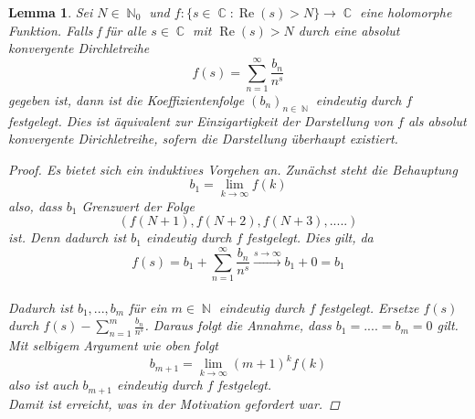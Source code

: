 \documentclass[10pt,a4paper]{article}
\theoremstyle{plain}
\newtheorem{lem}[thm]{Lemma}
\theoremstyle{definition}
\theoremstyle{remark}
\DeclareMathOperator{\C}{\mathbb{C}}
\DeclareMathOperator{\N}{\mathbb{N}}
\DeclareMathOperator{\re}{Re}
\begin{document}
 \begin{lem}
 
Sei $N \in \N_0$ und $f \colon \{s \in \C \colon \re(s)>N\}\rightarrow \C$ eine holomorphe Funktion. Falls f für alle $s \in \C$ mit $ \re(s) >N$ durch eine absolut konvergente Dirchletreihe $$f(s) = \sum_{n=1}^{\infty}\frac{b_n}{n^s}$$gegeben ist, dann ist die Koeffizientenfolge $(b_n)_{n \in \N}$ eindeutig durch $f$ festgelegt. Dies ist äquivalent zur Einzigartigkeit der Darstellung von $f$ als absolut konvergente Dirichletreihe, sofern die Darstellung überhaupt existiert.
 \\
\begin{proof}
 Es bietet sich ein induktives Vorgehen an.
Zunächst steht die Behauptung $$b_1= \lim_{k \to \infty} f(k)$$also, dass $b_1$ Grenzwert der Folge $$(f(N+1),f(N+2),f(N+3),.....)$$ ist. Denn dadurch ist $b_1$ eindeutig durch $f$ festgelegt. Dies gilt, da $$f(s)=b_1+\sum_{n=1}^{\infty} \frac{b_n}{n^s}\xrightarrow{s \to \infty} b_1 + 0 = b_1$$
\\ 
Dadurch ist $b_1,...,b_m$ für ein $m \in \N$ eindeutig durch $f$ festgelegt. Ersetze $f(s)$ durch $f(s)-\sum_{n=1}^{m}\frac{b_n}{n^s}$. Daraus folgt die Annahme, dass $b_1=....=b_m=0$ gilt. Mit selbigem Argument wie oben folgt $$b_{m+1}=\lim_{k\to \infty}(m+1)^k f(k)$$ also ist auch $b_{m+1}$ eindeutig durch $f$ festgelegt.
\\
Damit ist erreicht, was in der Motivation gefordert war.

\end{proof}


\end{lem}
\end{document}
